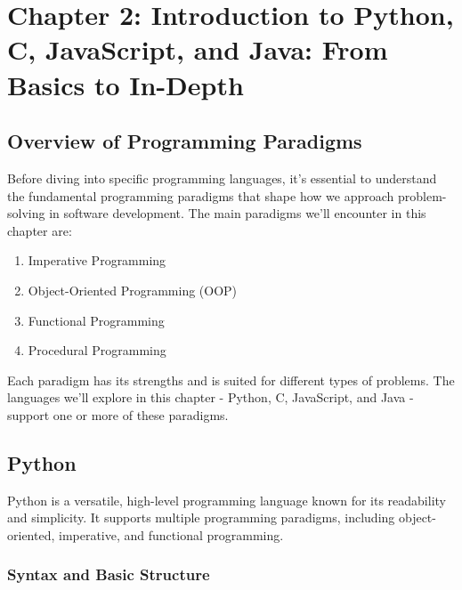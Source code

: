 

\hypertarget{chapter-2-introduction-to-python-c-javascript-and-java-from-basics-to-in-depth}{%
\section{Chapter 2: Introduction to Python, C, JavaScript, and Java:
From Basics to
In-Depth}\label{chapter-2-introduction-to-python-c-javascript-and-java-from-basics-to-in-depth}}

\hypertarget{overview-of-programming-paradigms}{%
\subsection{Overview of Programming
Paradigms}\label{overview-of-programming-paradigms}}

Before diving into specific programming languages, it's essential to
understand the fundamental programming paradigms that shape how we
approach problem-solving in software development. The main paradigms
we'll encounter in this chapter are:

\begin{enumerate}
\def\labelenumi{\arabic{enumi}.}
\tightlist
\item
  Imperative Programming
\item
  Object-Oriented Programming (OOP)
\item
  Functional Programming
\item
  Procedural Programming
\end{enumerate}

Each paradigm has its strengths and is suited for different types of
problems. The languages we'll explore in this chapter - Python, C,
JavaScript, and Java - support one or more of these paradigms.

\hypertarget{python}{%
\subsection{Python}\label{python}}

Python is a versatile, high-level programming language known for its
readability and simplicity. It supports multiple programming paradigms,
including object-oriented, imperative, and functional programming.

\hypertarget{syntax-and-basic-structure}{%
\subsubsection{Syntax and Basic
Structure}\label{syntax-and-basic-structure}}

